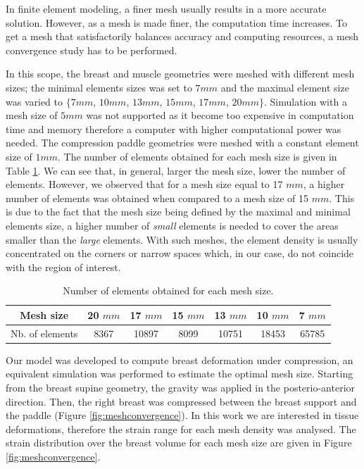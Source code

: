 In finite element modeling, a finer mesh usually results in a more accurate solution. However, as a mesh is made finer, the computation time increases. To get a mesh that satisfactorily balances accuracy and computing resources, a mesh convergence study has to be performed.

In this scope, the breast and muscle geometries were meshed with different mesh sizes; the minimal elements sizes was set to $7mm$ and the maximal element size was varied to $\lbrace 7mm$,  $10 mm$, $13mm$, $15mm$, $17mm$, $20mm\rbrace$. Simulation with a mesh size of $5mm$ was not supported as it become too expensive in computation time and memory therefore a computer with higher computational power was needed.  The compression paddle geometries were meshed with a constant element size of $1mm$. The number of elements obtained for each mesh size is given in Table  \ref{nbElementsvsmeshsize}. We can see that, in general, larger the mesh size, lower the number of elements. However, we observed that for a mesh size equal to 17 $mm$, a higher number of elements was obtained when compared to a mesh size of 15 $mm$. This is due to the fact that the mesh size being defined by the maximal and minimal elements size, a higher number of \textit{small} elements is needed to cover the areas smaller than the \textit{large} elements. With such meshes, the element density is usually concentrated on the corners or narrow spaces which, in our case, do not coincide with the region of interest.  

\begin{table}[!h]
\begin{tabular}{|c|c|c|c|c|c|c|}
\hline
Mesh size & 20 $mm$ & 17 $mm$ & 15 $mm$ & 13 $mm$ & 10 $mm$ & 7 $mm$ \\
\hline
Nb. of elements & 8367 & 10897 & 8099 & 10751 & 18453 & 65785 \\
\hline
\end{tabular}
\caption{Number of elements obtained for each mesh size.}
\label{nbElementsvsmeshsize}
\end{table} 

Our model was developed to compute breast deformation under compression, an equivalent simulation was performed to estimate the optimal mesh size. Starting from the breast supine geometry, the gravity was applied in the posterio-anterior direction. Then, the right breast was compressed between the breast support and the paddle (Figure \ref{fig:meshconvergence}). In this work we are interested in tissue deformations, therefore the strain range for each mesh density was analysed. The strain distribution over the breast volume for each mesh size are given in Figure \ref{fig:meshconvergence}. 

